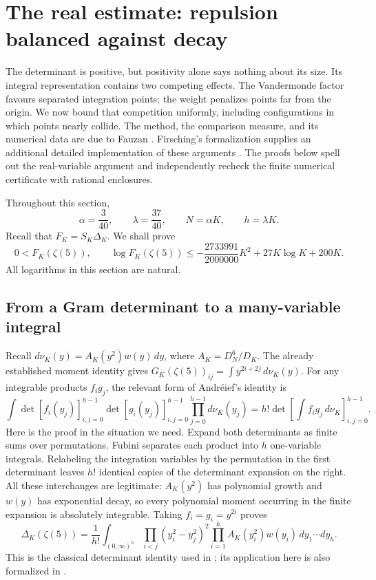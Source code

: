 \section{The real estimate: repulsion balanced against decay}
\label{analytic:section}

The determinant is positive, but positivity alone says nothing about its
size. Its integral representation contains two competing effects. The
Vandermonde factor favours separated integration points; the weight
penalizes points far from the origin. We now bound that competition
uniformly, including configurations in which points nearly collide.
The method, the comparison measure, and its numerical data are due to
Fauzan \cite[Section 6 and Appendix A]{fauzan}.
Firsching's formalization supplies an additional detailed implementation
of these arguments \cite[\texttt{Apery/Energy*.lean},
\texttt{Apery/RealBound.lean}]{firsching}.
The proofs below spell out the real-variable argument and independently
recheck the finite numerical certificate with rational enclosures.

Throughout this section,
\[
 \alpha=\frac3{40},\qquad \lambda=\frac{37}{40},\qquad
 N=\alpha K,\qquad h=\lambda K.
\]
Recall that \(F_K=S_K\Delta_K\). We shall prove
\begin{equation}\label{analytic:goal}
 0<F_K(\zeta(5)),\qquad
 \log F_K(\zeta(5))
 \leq -\frac{2733991}{2000000}K^2+27K\log K+200K.
\end{equation}
All logarithms in this section are natural.

\subsection{From a Gram determinant to a many-variable integral}

Recall \(d\nu_K(y)=A_K(y^2)w(y)\,dy\), where
\(A_K=D_N^6/D_K\). The already established moment identity gives
\(G_K(\zeta(5))_{ij}=\int y^{2i+2j}\,d\nu_K(y)\).
For any integrable products \(f_i g_j\), the relevant form of
Andr\'eief's identity \cite{andreief} is
\[
 \int \det[f_i(y_j)]_{i,j=0}^{h-1}
       \det[g_i(y_j)]_{i,j=0}^{h-1}
       \prod_{j=0}^{h-1}d\nu_K(y_j)
 =h!\det\left[\int f_i g_j\,d\nu_K\right]_{i,j=0}^{h-1}.
\]
Here is the proof in the situation we need. Expand both determinants as
finite sums over permutations. Fubini separates each product into \(h\)
one-variable integrals. Relabeling the integration variables by the
permutation in the first determinant leaves \(h!\) identical copies of
the determinant expansion on the right. All these interchanges are
legitimate: \(A_K(y^2)\) has polynomial growth and \(w(y)\) has exponential
decay, so every polynomial moment occurring in the finite expansion is
absolutely integrable. Taking \(f_i=g_i=y^{2i}\) proves
\begin{equation}\label{analytic:andreief}
 \Delta_K(\zeta(5))=
 \frac1{h!}\int_{(0,\infty)^h}
 \prod_{i<j}(y_i^2-y_j^2)^2
 \prod_{i=1}^h A_K(y_i^2)w(y_i)\,dy_1\cdots dy_h .
\end{equation}
This is the classical determinant identity used in
\cite[(6.10)]{fauzan}; its application here is also formalized in
\cite[\texttt{Apery/Andreief.lean},
\texttt{Apery/DetIntegral.lean}]{firsching}.

